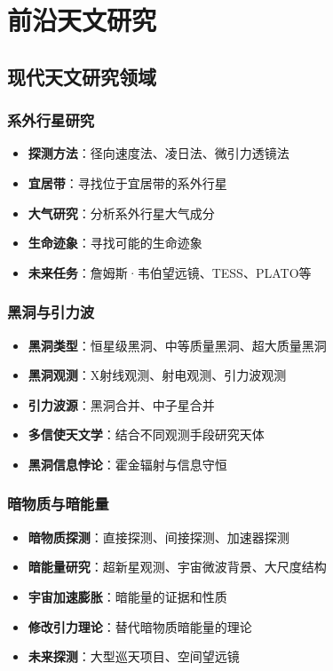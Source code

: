 \documentclass[12pt,UTF8]{ctexbook}
\begin{document}
\part{前沿天文研究}

\chapter{现代天文研究领域}
\section{系外行星研究}

\begin{itemize}
  \item \textbf{探测方法}：径向速度法、凌日法、微引力透镜法
  \item \textbf{宜居带}：寻找位于宜居带的系外行星
  \item \textbf{大气研究}：分析系外行星大气成分
  \item \textbf{生命迹象}：寻找可能的生命迹象
  \item \textbf{未来任务}：詹姆斯·韦伯望远镜、TESS、PLATO等
\end{itemize}

\section{黑洞与引力波}

\begin{itemize}
  \item \textbf{黑洞类型}：恒星级黑洞、中等质量黑洞、超大质量黑洞
  \item \textbf{黑洞观测}：X射线观测、射电观测、引力波观测
  \item \textbf{引力波源}：黑洞合并、中子星合并
  \item \textbf{多信使天文学}：结合不同观测手段研究天体
  \item \textbf{黑洞信息悖论}：霍金辐射与信息守恒
\end{itemize}

\section{暗物质与暗能量}

\begin{itemize}
  \item \textbf{暗物质探测}：直接探测、间接探测、加速器探测
  \item \textbf{暗能量研究}：超新星观测、宇宙微波背景、大尺度结构
  \item \textbf{宇宙加速膨胀}：暗能量的证据和性质
  \item \textbf{修改引力理论}：替代暗物质暗能量的理论
  \item \textbf{未来探测}：大型巡天项目、空间望远镜
\end{itemize}
\end{document}
